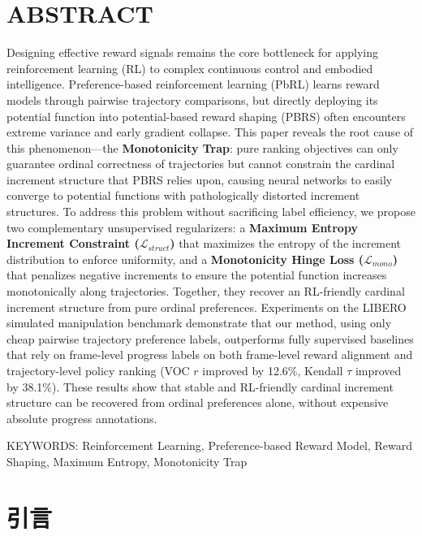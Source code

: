 \section*{ABSTRACT}
Designing effective reward signals remains the core bottleneck for applying reinforcement learning (RL) to complex continuous control and embodied intelligence. Preference-based reinforcement learning (PbRL) learns reward models through pairwise trajectory comparisons, but directly deploying its potential function into potential-based reward shaping (PBRS) often encounters extreme variance and early gradient collapse. This paper reveals the root cause of this phenomenon---the \textbf{Monotonicity Trap}: pure ranking objectives can only guarantee ordinal correctness of trajectories but cannot constrain the cardinal increment structure that PBRS relies upon, causing neural networks to easily converge to potential functions with pathologically distorted increment structures. To address this problem without sacrificing label efficiency, we propose two complementary unsupervised regularizers: a \textbf{Maximum Entropy Increment Constraint ($\mathcal{L}_{struct}$)} that maximizes the entropy of the increment distribution to enforce uniformity, and a \textbf{Monotonicity Hinge Loss ($\mathcal{L}_{mono}$)} that penalizes negative increments to ensure the potential function increases monotonically along trajectories. Together, they recover an RL-friendly cardinal increment structure from pure ordinal preferences. Experiments on the LIBERO simulated manipulation benchmark demonstrate that our method, using only cheap pairwise trajectory preference labels, outperforms fully supervised baselines that rely on frame-level progress labels on both frame-level reward alignment and trajectory-level policy ranking (VOC $r$ improved by 12.6\%, Kendall $\tau$ improved by 38.1\%). These results show that stable and RL-friendly cardinal increment structure can be recovered from ordinal preferences alone, without expensive absolute progress annotations.

\vspace{1em}\noindent
{\hei KEYWORDS:}
{\songti \rmfamily Reinforcement Learning, Preference-based Reward Model, Reward Shaping, Maximum Entropy, Monotonicity Trap}

\clearpage



\setcounter{page}{1}

\section{引言}

